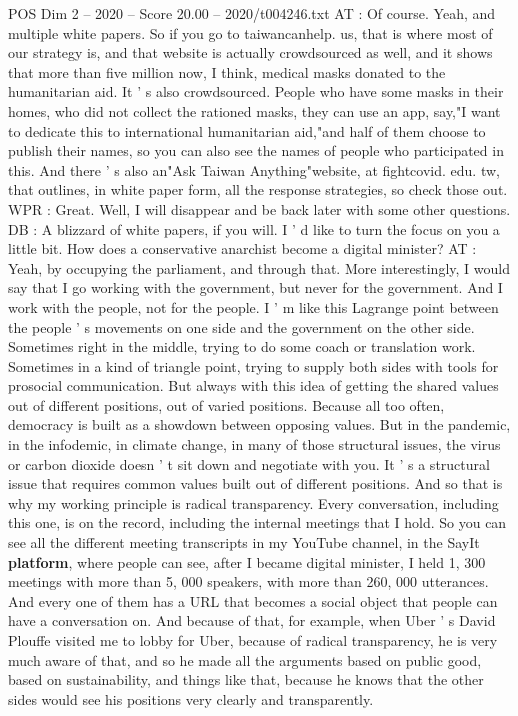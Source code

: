 \begin{textsample}{POS Dim 2 – 2020 – Score 20.00 – 2020/t004246.txt}
AT : Of course.
Yeah, and multiple white papers.
So if you go to taiwancanhelp. us, that is where most of our strategy is, and that website is actually crowdsourced as well, and it shows that more than five million now, I think, medical masks donated to the humanitarian aid.
It ' s also crowdsourced.
People who have some masks in their homes, who did not collect the rationed masks, they can use an app, say,"I want to dedicate this to international humanitarian aid,"and half of them choose to publish their names, so you can also see the names of people who participated in this.
And there ' s also an"Ask Taiwan Anything"website, at fightcovid. edu. tw, that outlines, in white paper form, all the response strategies, so check those out.
WPR : Great.
Well, I will disappear and be back later with some other questions.
DB : A blizzard of white papers, if you will.
I ' d like to turn the focus on you a little bit.
How does a conservative anarchist become a digital minister?
AT : Yeah, by occupying the parliament, and through that.
More interestingly, I would say that I go working with the government, but never for the government.
And I work with the people, not for the people.
I ' m like this Lagrange point between the people ' s movements on one side and the government on the other side.
Sometimes right in the middle, trying to do some coach or translation work.
Sometimes in a kind of triangle point, trying to supply both sides with tools for prosocial communication.
But always with this idea of getting the shared values out of different positions, out of varied positions.
Because all too often, democracy is built as a showdown between opposing values.
But in the pandemic, in the infodemic, in climate change, in many of those structural issues, the virus or carbon dioxide doesn ' t sit down and negotiate with you.
It ' s a structural issue that requires common values built out of different positions.
And so that is why my working principle is radical transparency.
Every conversation, including this one, is on the record, including the internal meetings that I hold.
So you can see all the different meeting transcripts in my YouTube channel, in the SayIt \textbf{platform}, where people can see, after I became digital minister, I held 1, 300 meetings with more than 5, 000 speakers, with more than 260, 000 utterances.
And every one of them has a URL that becomes a social object that people can have a conversation on.
And because of that, for example, when Uber ' s David Plouffe visited me to lobby for Uber, because of radical transparency, he is very much aware of that, and so he made all the arguments based on public good, based on sustainability, and things like that, because he knows that the other sides would see his positions very clearly and transparently.

\end{textsample}
